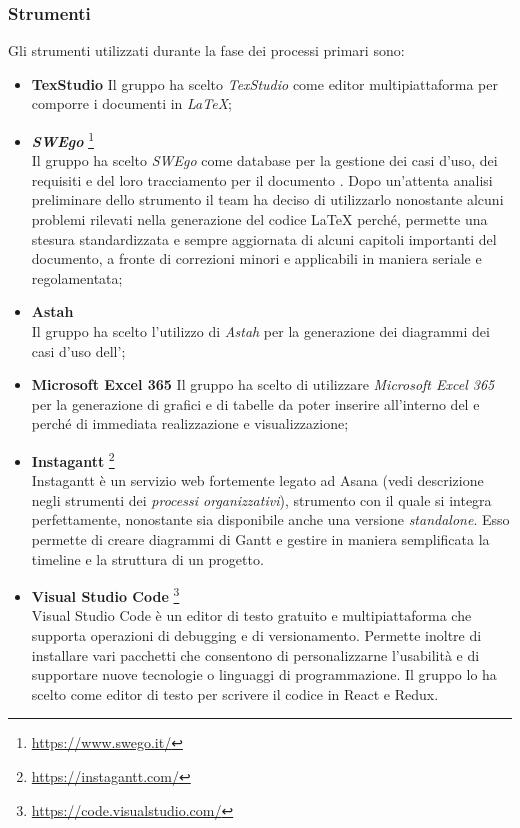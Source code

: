 \subsubsection{Strumenti}
Gli strumenti utilizzati durante la fase dei processi primari sono:
\begin{itemize}
	\item \textbf{TexStudio}
	\newline Il gruppo ha scelto \emph{TexStudio} come editor multipiattaforma per comporre i documenti in \emph{\LaTeX};
	\item \emph{\textbf{\emph{SWEgo}}} \footnote{\href{https://www.swego.it/}{https://www.swego.it/}}
	~\\ Il gruppo ha scelto \emph{SWEgo} come database per la gestione dei casi d'uso, dei requisiti e del loro tracciamento per il documento \AdR{}. Dopo un'attenta analisi preliminare dello strumento il team ha deciso di utilizzarlo nonostante alcuni problemi rilevati nella generazione del codice \LaTeX{} perché, permette una stesura standardizzata e sempre aggiornata di alcuni capitoli importanti del documento, a fronte di correzioni minori e applicabili in maniera seriale e regolamentata;
	\item \textbf{Astah}
	~\\Il gruppo ha scelto l'utilizzo di \emph{Astah} per la generazione dei diagrammi dei casi d'uso dell'\AdR{};
	\item \textbf{Microsoft Excel 365}
	\newline Il gruppo ha scelto di utilizzare \emph{Microsoft Excel 365} per la generazione di grafici e di tabelle da poter inserire all'interno del \PdQ{} e \PdP{} perché di immediata realizzazione e visualizzazione;
	\item \textbf{Instagantt} \footnote{\href{https://instagantt.com/}{https://instagantt.com/}}
	~\\Instagantt è un servizio web fortemente legato ad Asana (vedi descrizione negli strumenti dei \emph{processi organizzativi}), strumento con il quale si integra perfettamente, nonostante sia disponibile anche una versione \emph{standalone}. Esso permette di creare diagrammi di Gantt e gestire in maniera semplificata la timeline e la struttura di un progetto.
	\item \textbf{Visual Studio Code} \footnote{\href{https://code.visualstudio.com/}{https://code.visualstudio.com/}} 
	~\\Visual Studio Code è un editor di testo gratuito e multipiattaforma che supporta operazioni di debugging e di versionamento. Permette inoltre di installare vari pacchetti che consentono di personalizzarne l'usabilità e di supportare nuove tecnologie o linguaggi di programmazione. Il gruppo lo ha scelto come editor di testo per scrivere il codice in React e Redux.

\end{itemize}
